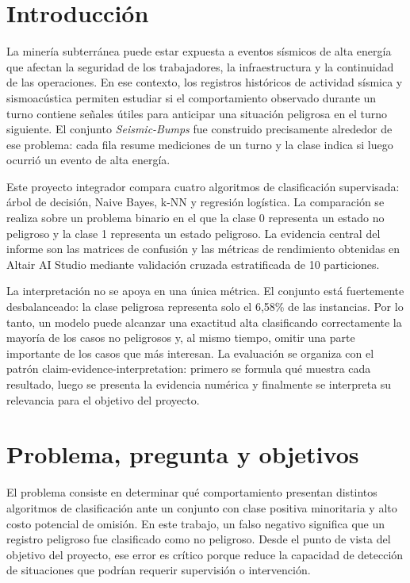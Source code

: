 \documentclass[12pt,a4paper]{article}
\begin{document}
\tableofcontents
\newpage

\section{Introducción}
La minería subterránea puede estar expuesta a eventos sísmicos de alta energía que afectan la seguridad de los trabajadores, la infraestructura y la continuidad de las operaciones. En ese contexto, los registros históricos de actividad sísmica y sismoacústica permiten estudiar si el comportamiento observado durante un turno contiene señales útiles para anticipar una situación peligrosa en el turno siguiente. El conjunto \textit{Seismic-Bumps} fue construido precisamente alrededor de ese problema: cada fila resume mediciones de un turno y la clase indica si luego ocurrió un evento de alta energía.

Este proyecto integrador compara cuatro algoritmos de clasificación supervisada: árbol de decisión, Naive Bayes, k-NN y regresión logística. La comparación se realiza sobre un problema binario en el que la clase 0 representa un estado no peligroso y la clase 1 representa un estado peligroso. La evidencia central del informe son las matrices de confusión y las métricas de rendimiento obtenidas en Altair AI Studio mediante validación cruzada estratificada de 10 particiones.

La interpretación no se apoya en una única métrica. El conjunto está fuertemente desbalanceado: la clase peligrosa representa solo el 6,58\% de las instancias. Por lo tanto, un modelo puede alcanzar una exactitud alta clasificando correctamente la mayoría de los casos no peligrosos y, al mismo tiempo, omitir una parte importante de los casos que más interesan. La evaluación se organiza con el patrón claim-evidence-interpretation: primero se formula qué muestra cada resultado, luego se presenta la evidencia numérica y finalmente se interpreta su relevancia para el objetivo del proyecto.

\section{Problema, pregunta y objetivos}
El problema consiste en determinar qué comportamiento presentan distintos algoritmos de clasificación ante un conjunto con clase positiva minoritaria y alto costo potencial de omisión. En este trabajo, un falso negativo significa que un registro peligroso fue clasificado como no peligroso. Desde el punto de vista del objetivo del proyecto, ese error es crítico porque reduce la capacidad de detección de situaciones que podrían requerir supervisión o intervención.
\end{document}
